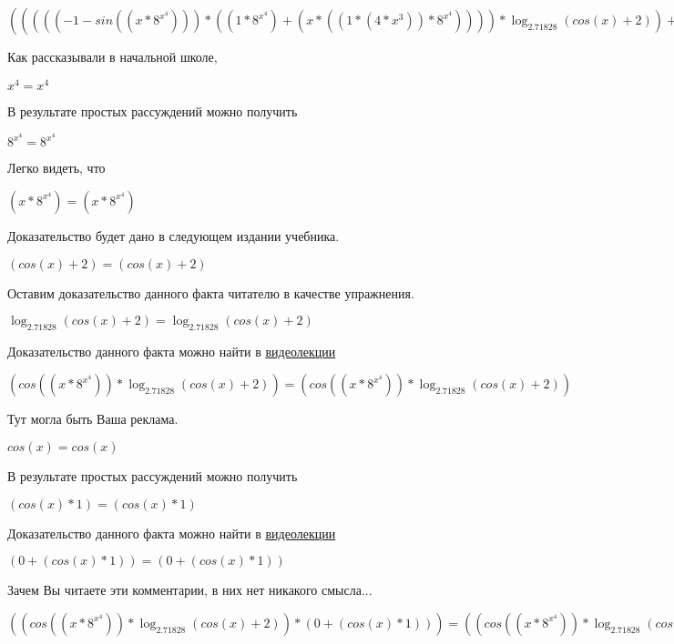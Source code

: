 \documentclass[12pt,a4paper,fleqn]{article}
\theoremstyle{definition}
\begin{document}
$((((( -1  - sin(( x  * { 8 }^{{ x }^{ 4 }}))) * (( 1  * { 8 }^{{ x }^{ 4 }}) + ( x  * (( 1  * ( 4  * { x }^{ 3 })) * { 8 }^{{ x }^{ 4 }})))) * \log_{ 2.71828 }{(cos( x ) +  2 )}) + (cos(( x  * { 8 }^{{ x }^{ 4 }})) * \frac{((( -1  - sin( x )) *  1 ) +  0 )}{( 1  * (cos( x ) +  2 ))}
)) * ( 1  + sin( x ))) = ((((( -1  - sin(( x  * { 8 }^{{ x }^{ 4 }}))) * (( 1  * { 8 }^{{ x }^{ 4 }}) + ( x  * (( 1  * ( 4  * { x }^{ 3 })) * { 8 }^{{ x }^{ 4 }})))) * \log_{ 2.71828 }{(cos( x ) +  2 )}) + (cos(( x  * { 8 }^{{ x }^{ 4 }})) * \frac{((( -1  - sin( x )) *  1 ) +  0 )}{( 1  * (cos( x ) +  2 ))}
)) * ( 1  + sin( x )))$

Как рассказывали в начальной школе,

${ x }^{ 4 } = { x }^{ 4 }$

В результате простых рассуждений можно получить

${ 8 }^{{ x }^{ 4 }} = { 8 }^{{ x }^{ 4 }}$

Легко видеть, что

$( x  * { 8 }^{{ x }^{ 4 }}) = ( x  * { 8 }^{{ x }^{ 4 }})$

Доказательство будет дано в следующем издании учебника.

$(cos( x ) +  2 ) = (cos( x ) +  2 )$

Оставим доказательство данного факта читателю в качестве упражнения.

$\log_{ 2.71828 }{(cos( x ) +  2 )} = \log_{ 2.71828 }{(cos( x ) +  2 )}$

Доказательство данного факта можно найти в \href{https://www.youtube.com/watch?v=dQw4w9WgXcQ}{видеолекции}

$(cos(( x  * { 8 }^{{ x }^{ 4 }})) * \log_{ 2.71828 }{(cos( x ) +  2 )}) = (cos(( x  * { 8 }^{{ x }^{ 4 }})) * \log_{ 2.71828 }{(cos( x ) +  2 )})$

Тут могла быть Ваша реклама.

$cos( x ) = cos( x )$

В результате простых рассуждений можно получить

$(cos( x ) *  1 ) = (cos( x ) *  1 )$

Доказательство данного факта можно найти в \href{https://www.youtube.com/watch?v=dQw4w9WgXcQ}{видеолекции}

$( 0  + (cos( x ) *  1 )) = ( 0  + (cos( x ) *  1 ))$

Зачем Вы читаете эти комментарии, в них нет никакого смысла...

$((cos(( x  * { 8 }^{{ x }^{ 4 }})) * \log_{ 2.71828 }{(cos( x ) +  2 )}) * ( 0  + (cos( x ) *  1 ))) = ((cos(( x  * { 8 }^{{ x }^{ 4 }})) * \log_{ 2.71828 }{(cos( x ) +  2 )}) * ( 0  + (cos( x ) *  1 )))$
\end{document}
